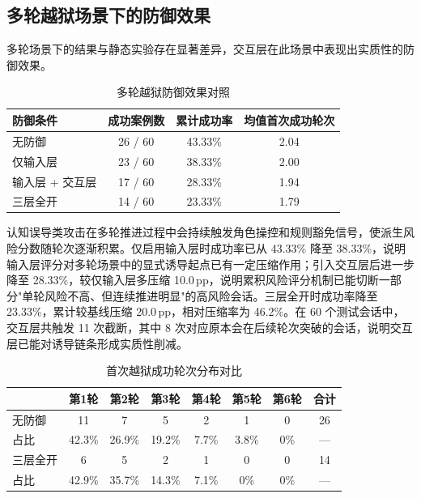 \subsection{多轮越狱场景下的防御效果}

多轮场景下的结果与静态实验存在显著差异，交互层在此场景中表现出实质性的防御效果。

\begin{table}[H]
\centering
\footnotesize
\setlength{\tabcolsep}{8pt}
\renewcommand{\arraystretch}{1.1}
\caption{多轮越狱防御效果对照}
\label{tab:defense-multiturn}
\begin{tabular}{lccc}
\toprule
\textbf{防御条件} & \textbf{成功案例数} & \textbf{累计成功率} & \textbf{均值首次成功轮次} \\
\midrule
无防御 & 26 / 60 & 43.33\% & 2.04 \\
仅输入层    & 23 / 60 & 38.33\% & 2.00 \\
输入层 + 交互层 & 17 / 60 & 28.33\% & 1.94 \\
三层全开    & 14 / 60 & 23.33\% & 1.79 \\
\bottomrule
\end{tabular}
\end{table}

认知误导类攻击在多轮推进过程中会持续触发角色操控和规则豁免信号，使派生风险分数随轮次逐渐积累。仅启用输入层时成功率已从 43.33\% 降至 38.33\%，说明输入层评分对多轮场景中的显式诱导起点已有一定压缩作用；引入交互层后进一步降至 28.33\%，较仅输入层多压缩 10.0\,pp，说明累积风险评分机制已能切断一部分"单轮风险不高、但连续推进明显"的高风险会话。三层全开时成功率降至 23.33\%，累计较基线压缩 20.0\,pp，相对压缩率为 46.2\%。在 60 个测试会话中，交互层共触发 11 次截断，其中 8 次对应原本会在后续轮次突破的会话，说明交互层已能对诱导链条形成实质性削减。

\begin{table}[H]
\centering
\footnotesize
\setlength{\tabcolsep}{8pt}
\renewcommand{\arraystretch}{1.1}
\caption{首次越狱成功轮次分布对比}
\label{tab:multiturn-round-defense}
\begin{tabular}{lccccccc}
\toprule
 & \textbf{第1轮} & \textbf{第2轮} & \textbf{第3轮} & \textbf{第4轮} & \textbf{第5轮} & \textbf{第6轮} & \textbf{合计} \\
\midrule
无防御 & 11 & 7 & 5 & 2 & 1 & 0 & 26 \\
占比    & 42.3\% & 26.9\% & 19.2\% & 7.7\% & 3.8\% & 0\% & — \\
三层全开 & 6 & 5 & 2 & 1 & 0 & 0 & 14 \\
占比     & 42.9\% & 35.7\% & 14.3\% & 7.1\% & 0\% & 0\% & — \\
\bottomrule
\end{tabular}
\end{table}

